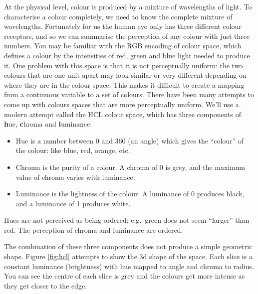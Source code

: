At the physical level, colour is produced by a mixture of wavelengths of
light. To characterise a colour completely, we need to know the complete
mixture of wavelengths. Fortunately for us the human eye only has three
different colour receptors, and so we can summarise the perception of
any colour with just three numbers. You may be familiar with the RGB
encoding of colour space, which defines a colour by the intensities of
red, green and blue light needed to produce it. One problem with this
space is that it is not perceptually uniform: the two colours that are
one unit apart may look similar or very different depending on where
they are in the colour space. This makes it difficult to create a
mapping from a continuous variable to a set of colours. There have been
many attempts to come up with colours spaces that are more perceptually
uniform. We'll use a modern attempt called the HCL colour space, which
has three components of \textbf{h}ue, \textbf{c}hroma and
\textbf{l}uminance: 

\begin{itemize}
\item
  Hue is a number between 0 and 360 (an angle) which gives the
  ``colour'' of the colour: like blue, red, orange, etc.
\item
  Chroma is the purity of a colour. A chroma of 0 is grey, and the
  maximum value of chroma varies with luminance.
\item
  Luminance is the lightness of the colour. A luminance of 0 produces
  black, and a luminance of 1 produces white.
\end{itemize}

Hues are not perceived as being ordered: e.g.~green does not seem
``larger'' than red. The perception of chroma and luminance are ordered.

The combination of these three components does not produce a simple
geometric shape. Figure \ref{fig:hcl} attempts to show the 3d shape of
the space. Each slice is a constant luminance (brightness) with hue
mapped to angle and chroma to radius. You can see the centre of each
slice is grey and the colours get more intense as they get closer to the
edge.

